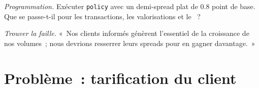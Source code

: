 \begin{exercise}[$\star\star\star$]\label{exo:s2:flow-market-making-at-a-bank:7}
\emph{Programmation.} Exécuter \texttt{policy} avec un demi-spread plat de 0.8 point de base. Que se passe-t-il pour les transactions, les valorisations et le ~?
\end{exercise}

\begin{exercise}[$\star\star\star$]\label{exo:s2:flow-market-making-at-a-bank:8}
\emph{Trouver la faille.} «~Nos clients informés génèrent l'essentiel de la croissance de nos volumes~; nous devrions resserrer leurs spreads pour en gagner davantage.~»
\end{exercise}

\section{Problème~: tarification du client}


